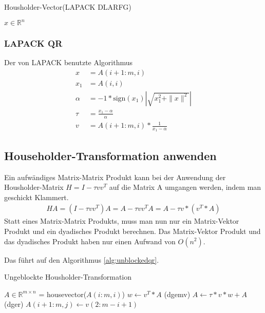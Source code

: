 \begin{algorithm}
	\caption{Housholder-Vector(LAPACK DLARFG)}
	\begin{algorithmic}
		\State $x \in \mathbb{R}^n$
	\end{algorithmic} 
	\label{alg:unblockedqr}
\end{algorithm}

\subsubsection{LAPACK QR}
Der von LAPACK benutzte Algorithmus \cite{DGEQR2}
\begin{align*}
x &= A(i+1:m,i)\\
x_1 &= A(i,i)\\
\alpha &= -1 * \text{sign}(x_1) \left|\sqrt{x_1^2 + \|x\|^2}\right|\\
\tau &= \frac{x_1 - \alpha}{\alpha} \\
v &= A(i+1:m,i) * \frac{1}{x_1 - \alpha}
\end{align*}



\subsection{Householder-Transformation anwenden}
Ein aufwändiges Matrix-Matrix Produkt kann bei der Anwendung der Housholder-Matrix $H = I - \tau vv^T$ auf die Matrix A umgangen werden, indem man geschickt Klammert.
\begin{align*} 
H A =(I - \tau vv^T) A= A - \tau vv^T A = A - \tau v*(v^T*A)
\end{align*}
Statt eines Matrix-Matrix Produkts, muss man nun nur ein Matrix-Vektor Produkt und ein dyadisches Produkt berechnen.
Das Matrix-Vektor Produkt und das dyadisches Produkt haben nur einen Aufwand von $O(n^2)$.




Das führt auf den Algorithmus \ref{alg:unblockedqr}. 
\begin{algorithm}
	\caption{Ungeblockte Housholder-Transformation}
	\begin{algorithmic}
	\State $A \in \mathbb{R}^{m \times n}$
	\For {i = 0 : n}
		\State [$v$, $\tau$] = housevector($A(i:m,i)$)
		\State $w \leftarrow v^T*A$ (dgemv)
		\State $ A \leftarrow \tau * v * w + A $ (dger)
		\If {i > m}
			\State $A(i + 1 : m, j) \leftarrow v(2 : m - i + 1)$
		\EndIf
	\EndFor	
\end{algorithmic} 
\label{alg:unblockedqr}
\end{algorithm}



